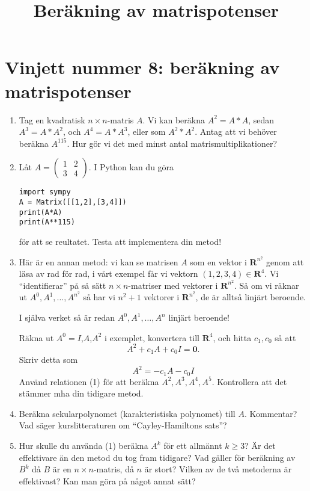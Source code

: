 \documentclass[10pt]{article}
\newcommand{\R}{\mathbf{R}}
\begin{document}
\title{Beräkning av matrispotenser}

\section{Vinjett nummer 8: beräkning av matrispotenser}
\begin{enumerate}
\item
  Tag en kvadratisk \(n \times n\)-matris \(A\).
  Vi kan beräkna \(A^2=A*A\), sedan \(A^3=A*A^2\), och \(A^4=A*A^3\),
  eller som \(A^2*A^2\).
Antag att vi behöver beräkna \(A^{115}\). Hur gör vi det med minst antal
  matrismultiplikationer?
\item
  Låt 
  \(A=
  \begin{pmatrix}
    1 & 2 \\ 3 & 4
  \end{pmatrix}
  \).
  I Python kan du göra
\begin{verbatim}
import sympy
A = Matrix([[1,2],[3,4]])
print(A*A)
print(A**115)
\end{verbatim}
  för att se reultatet.  Testa att implementera din metod!

  
\item Här är en annan metod:
  vi kan se matrisen \(A\) som en vektor i \(\R^{n^2}\) genom att läsa av rad för rad,
  i vårt exempel får vi vektorn
  \begin{math}
    (1,2,3,4) \in \R^4.
  \end{math}
  Vi ``identifierar'' på så sätt \(n\times n\)-matriser med vektorer i \(\R^{n^2}\).
  Så om vi räknar ut \(A^0,A^1,\dots,A^{n^2}\) så har vi \(n^2+1\) vektorer
  i \(\R^{n^2}\), de är alltså linjärt beroende.

  I själva verket så är redan \(A^0,A^1,\dots, A^n\) linjärt beroende!

  Räkna ut \(A^0=I\),\(A\),\(A^2\) i exemplet, konvertera till \(\R^4\),
  och hitta \(c_1,c_0\)
  så att
  \begin{displaymath}
    A^2 + c_1A + c_0I = \mathbf{0}.
  \end{displaymath}
  Skriv detta som
  \begin{equation}\label{e}
    A^2 = -c_1A - c_0I
  \end{equation}
  Använd relationen (1) för att beräkna \(A^2,A^3,A^4,A^5\). Kontrollera att
  det stämmer mha din tidigare metod.

  
\item Beräkna sekularpolynomet (karakteristiska polynomet) till \(A\). Kommentar?
Vad säger kurslitteraturen om ``Cayley-Hamiltons sats''?
\item  Hur skulle du använda (1) beräkna
  \(A^k\) för ett allmännt \(k \ge 3\)? Är det effektivare än den metod du tog fram
  tidigare? Vad gäller för beräkning av \(B^k\) då \(B\) är
  en \(n \times n\)-matris, då \(n\) är stort? Vilken av de två metoderna är
  effektivast? Kan man göra på något annat sätt?

  

\end{enumerate}
\end{document}
